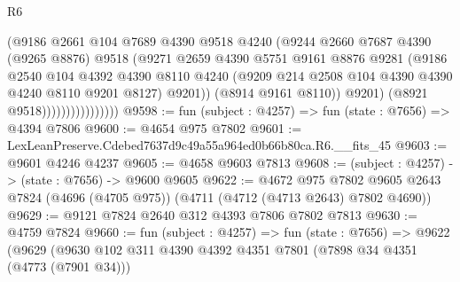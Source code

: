 \begin{lexlean}{R6}
\begin{coremodule}
                                  (@9186
                                    @2661
                                    @104
                                    @7689
                                    @4390
                                    @9518
                                    @4240
                                    (@9244
                                      @2660
                                      @7687
                                      @4390
                                      (@9265 @8876)
                                      @9518
                                      (@9271
                                        @2659
                                        @4390
                                        @5751
                                        @9161
                                        @8876
                                        @9281
                                        (@9186
                                          @2540
                                          @104
                                          @4392
                                          @4390
                                          @8110
                                          @4240
                                          (@9209
                                            @214
                                            @2508
                                            @104
                                            @4390
                                            @4390
                                            @4240
                                            @8110
                                            @9201
                                            @8127)
                                          @9201))
                                      (@8914 @9161 @8110))
                                    @9201)
                                  (@8921 @9518))))))))))))))))
@9598 := fun (subject : @4257) => fun (state : @7656) => @4394 @7806
@9600 := @4654 @975 @7802
@9601 := LexLeanPreserve.Cdebed7637d9c49a55a964ed0b66b80ca.R6.__fits_45
@9603 := @9601 @4246 @4237
@9605 := @4658 @9603 @7813
@9608 := (subject : @4257) -> (state : @7656) -> @9600 @9605
@9622 := @4672
    @975
    @7802
    @9605
    @2643
    @7824
    (@4696 (@4705 @975))
    (@4711 (@4712 (@4713 @2643) @7802 @4690))
@9629 := @9121 @7824 @2640 @312 @4393 @7806 @7802 @7813
@9630 := @4759 @7824
@9660 := fun (subject : @4257) =>
  fun (state : @7656) =>
  @9622
    (@9629
      (@9630
        @102
        @311
        @4390
        @4392
        @4351
        @7801
        (@7898 @34 @4351 (@4773 (@7901 @34)))

\end{coremodule}
\end{lexlean}

